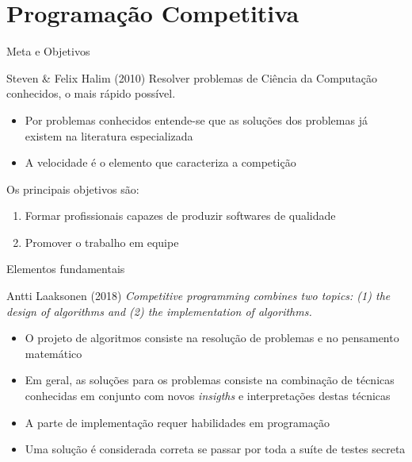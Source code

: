 \section{Programação Competitiva}

\begin{frame}[fragile]{Meta e Objetivos}

    \begin{block}{Steven \& Felix Halim (2010)}
    Resolver problemas de Ciência da Computação conhecidos, o mais rápido possível.
    \end{block}

    \begin{itemize}
        \item Por problemas conhecidos entende-se que as soluções dos problemas já existem 
        na literatura especializada
        \item A velocidade é o elemento que caracteriza a competição
    \end{itemize}

    Os principais objetivos são:

    \begin{enumerate}
        \item Formar profissionais capazes de produzir softwares de qualidade
        \item Promover o trabalho em equipe
    \end{enumerate}

\end{frame}


\begin{frame}[fragile]{Elementos fundamentais}

    \begin{block}{Antti Laaksonen (2018)}
    \textit{Competitive programming combines two topics: (1) the design of algorithms and
    (2) the implementation of algorithms.}
    \end{block}

    \begin{itemize}
        \item O projeto de algoritmos consiste na resolução de problemas e no pensamento
        matemático
        \item Em geral, as soluções para os problemas consiste na combinação de técnicas
        conhecidas em conjunto com novos \textit{insigths} e interpretações destas técnicas
        \item A parte de implementação requer habilidades em programação
        \item Uma solução é considerada correta se passar por toda a suíte de testes secreta
    \end{itemize}

\end{frame}
